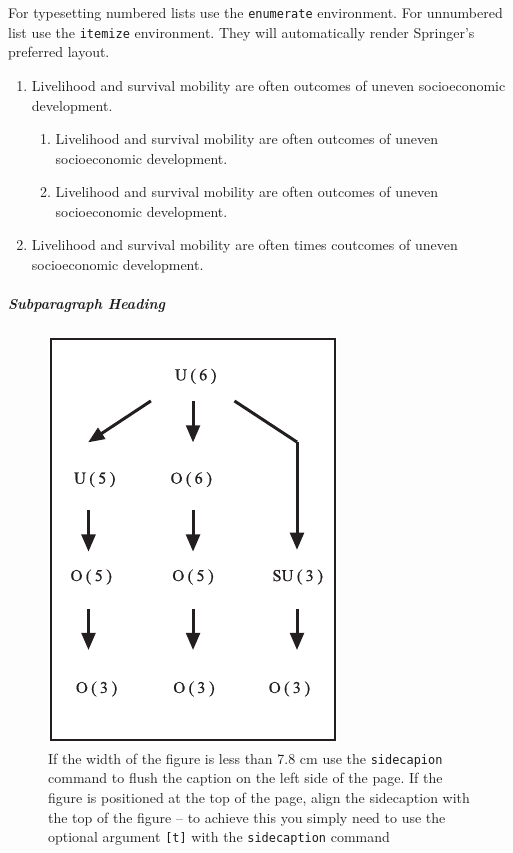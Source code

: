\documentclass[graybox]{svmult}
\begin{document}
For typesetting numbered lists use the \verb|enumerate| environment. For unnumbered list use the \verb|itemize| environment. They will automatically render Springer's preferred layout.

\begin{enumerate}
\item{Livelihood and survival mobility are often outcomes of uneven socioeconomic development.}
\begin{enumerate}
\item{Livelihood and survival mobility are often outcomes of uneven socioeconomic development.}
\item{Livelihood and survival mobility are often outcomes of uneven socioeconomic development.}
\end{enumerate}
\item{Livelihood and survival mobility are often times coutcomes of uneven socioeconomic development.}
\end{enumerate}


\subparagraph{Subparagraph Heading} 

\begin{figure}[t]
\sidecaption[t]
\includegraphics[scale=.65]{figure}
\caption{If the width of the figure is less than 7.8 cm use the \texttt{sidecapion} command to flush the caption on the left side of the page. If the figure is positioned at the top of the page, align the sidecaption with the top of the figure -- to achieve this you simply need to use the optional argument \texttt{[t]} with the \texttt{sidecaption} command}
\label{fig:2}       %
\end{figure}
\end{document}
